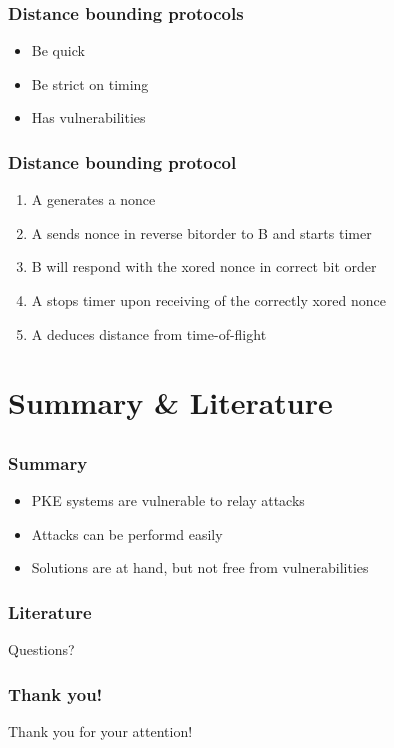 \documentclass[12pt]{beamer}
\begin{document}
	\begin{frame}
		\frametitle{Distance bounding protocols}
			\begin{itemize}
				\item Be quick
				\item Be strict on timing
				\item Has vulnerabilities
			\end{itemize}
	\end{frame}

	\begin{frame}
		\frametitle{Distance bounding protocol}
			\begin{enumerate}
				\item A generates a nonce
				\item A sends nonce in reverse bitorder to B and starts timer
				\item B will respond with the xored nonce in correct bit order
				\item A stops timer upon receiving of the correctly xored nonce
				\item A deduces distance from time-of-flight
			\end{enumerate}
	\end{frame}

\section{Summary \& Literature}
\subsection*{}
	\begin{frame}
		\frametitle{Summary}
			\begin{itemize}
				\item PKE systems are vulnerable to relay attacks 
				\item Attacks can be performd easily
				\item Solutions are at hand, but not free from vulnerabilities
			\end{itemize}
	\end{frame}
	\begin{frame}
	\frametitle{Literature}
	\tiny
	\nocite{*}
		\def\newblock{}
		
		
	\end{frame}
	
	\begin{frame}
		\begin{center}
			Questions?
		\end{center}
	\end{frame}	

	\begin{frame}
		\frametitle{Thank you!}
		\begin{center}
			Thank you for your attention!
		\end{center}
	\end{frame}	
\end{document}
